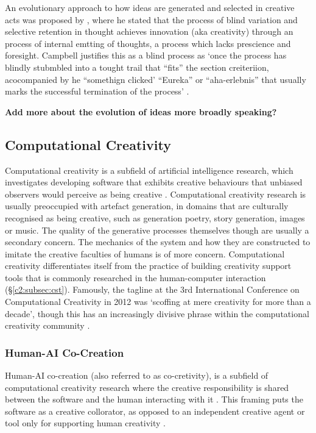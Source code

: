 An evolutionary approach to how ideas are generated and selected in creative acts was proposed by \cite{campbell1960blind}, where he stated that the process of blind variation and selective retention in thought achieves innovation (aka creativity) through an process of internal emtting of thoughts, a process which lacks prescience and foresight. 
Campbell justifies this as a blind process as `once the process has blindly stubmbled into a tought trail that ``fits'' the section creiteriion, acocompanied by he ``somethign clicked' ``Eureka'' or ``aha-erlebnis'' that usually marks the successful termination of the process' \citep{campbell1960blind}.

\textbf{Add more about the evolution of ideas more broadly speaking?}

\subsection{Computational Creativity}

Computational creativity is a subfield of artificial intelligence research, which investigates developing software that exhibits creative behaviours that unbiased observers would perceive as being creative \citep{colton2012computational}.
Computational creativity research is usually preoccupied with artefact generation, in domains that are culturally recognised as being creative, such as generation poetry, story generation, images or music. 
The quality of the generative processes themselves though are usually a secondary concern. 
The mechanics of the system and how they are constructed to imitate the creative faculties of humans is of more concern. 
Computational creativity differentiates itself from the practice of building creativity support tools that is commonly researched in the human-computer interaction (\S \ref{c2:subsec:cst}).
Famously, the tagline at the 3rd International Conference on Computational Creativity in 2012 was ‘scoffing at mere creativity for more than a decade’, though this has an increasingly divisive phrase within the computational creativity community \citep{ventura2016mere}.

\subsubsection{Human-AI Co-Creation}

Human-AI co-creation (also referred to as co-cretivity), is a subfield of computational creativity research where the creative responsibility is shared between the software and the human interacting with it \citep{candy2002modeling}.
This framing puts the software as a creative collorator, as opposed to an independent creative agent or tool only for supporting human creativity \citep{feldman2017co}.


